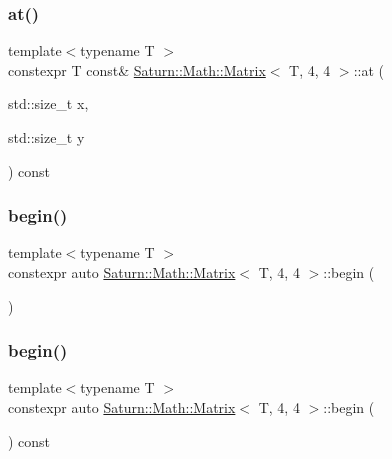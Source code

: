 \subsubsection{\texorpdfstring{at()}{at()}\hspace{0.1cm}{\footnotesize\ttfamily [2/2]}}
{\footnotesize\ttfamily template$<$typename T $>$ \\
constexpr T const\& \mbox{\hyperlink{class_saturn_1_1_math_1_1_matrix}{Saturn\+::\+Math\+::\+Matrix}}$<$ T, 4, 4 $>$\+::at (\begin{DoxyParamCaption}\item[{std\+::size\+\_\+t}]{x,  }\item[{std\+::size\+\_\+t}]{y }\end{DoxyParamCaption}) const\hspace{0.3cm}{\ttfamily [inline]}}

\mbox{\label{class_saturn_1_1_math_1_1_matrix_3_01_t_00_014_00_014_01_4_aa4a6c048565150e951229dcb914a0520}} 
\subsubsection{\texorpdfstring{begin()}{begin()}\hspace{0.1cm}{\footnotesize\ttfamily [1/2]}}
{\footnotesize\ttfamily template$<$typename T $>$ \\
constexpr auto \mbox{\hyperlink{class_saturn_1_1_math_1_1_matrix}{Saturn\+::\+Math\+::\+Matrix}}$<$ T, 4, 4 $>$\+::begin (\begin{DoxyParamCaption}{ }\end{DoxyParamCaption})\hspace{0.3cm}{\ttfamily [inline]}}

\mbox{\label{class_saturn_1_1_math_1_1_matrix_3_01_t_00_014_00_014_01_4_a90ce388e9ccf6a30b1a9afed1c96f0b0}} 
\subsubsection{\texorpdfstring{begin()}{begin()}\hspace{0.1cm}{\footnotesize\ttfamily [2/2]}}
{\footnotesize\ttfamily template$<$typename T $>$ \\
constexpr auto \mbox{\hyperlink{class_saturn_1_1_math_1_1_matrix}{Saturn\+::\+Math\+::\+Matrix}}$<$ T, 4, 4 $>$\+::begin (\begin{DoxyParamCaption}{ }\end{DoxyParamCaption}) const\hspace{0.3cm}{\ttfamily [inline]}}

